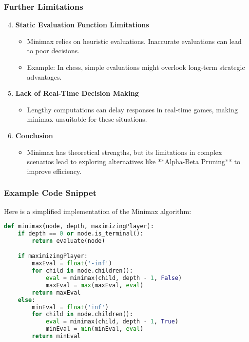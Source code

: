 \documentclass[aspectratio=169]{beamer}
\begin{document}
\begin{frame}
    \frametitle{Further Limitations}
    \begin{enumerate}
        \setcounter{enumi}{3}
        \item \textbf{Static Evaluation Function Limitations}
        \begin{itemize}
            \item Minimax relies on heuristic evaluations. Inaccurate evaluations can lead to poor decisions.
            \item Example: In chess, simple evaluations might overlook long-term strategic advantages.
        \end{itemize}
        
        \item \textbf{Lack of Real-Time Decision Making}
        \begin{itemize}
            \item Lengthy computations can delay responses in real-time games, making minimax unsuitable for these situations.
        \end{itemize}
        
        \item \textbf{Conclusion}
        \begin{itemize}
            \item Minimax has theoretical strengths, but its limitations in complex scenarios lead to exploring alternatives like **Alpha-Beta Pruning** to improve efficiency.
        \end{itemize}
    \end{enumerate}
\end{frame}

\begin{frame}[fragile]
    \frametitle{Example Code Snippet}
    Here is a simplified implementation of the Minimax algorithm:
    \begin{lstlisting}[language=Python]
def minimax(node, depth, maximizingPlayer):
    if depth == 0 or node.is_terminal():
        return evaluate(node)

    if maximizingPlayer:
        maxEval = float('-inf')
        for child in node.children():
            eval = minimax(child, depth - 1, False)
            maxEval = max(maxEval, eval)
        return maxEval
    else:
        minEval = float('inf')
        for child in node.children():
            eval = minimax(child, depth - 1, True)
            minEval = min(minEval, eval)
        return minEval
    \end{lstlisting}
\end{frame}
\end{document}
